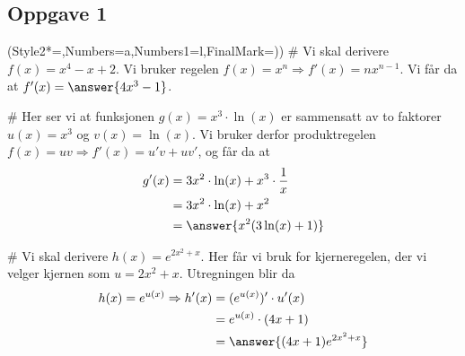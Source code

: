 \subsection*{Oppgave 1}
\begin{easylist}[enumerate]
	\ListProperties(Style2*=,Numbers=a,Numbers1=l,FinalMark={)})
	# Vi skal derivere $f(x) = x^4 - x +2$. Vi bruker regelen $f(x) = x^n \Rightarrow f'(x) = nx^{n-1}$. Vi får da at $f'(x) = \answer{4x^3 - 1}$.
	
	# Her ser vi at funksjonen $g(x) = x^3 \cdot \ln (x)$ er sammensatt av to faktorer $u(x) = x^3$ og $v(x) = \ln(x)$. 
	Vi bruker derfor produktregelen $f(x) = uv \Rightarrow f'(x) = u'v + uv'$, og får da at
	\begin{align*}
	g'(x) &= 3x^2 \cdot \ln(x) + x^3 \cdot \frac{1}{x}\\
			&= 3x^2 \cdot \ln(x) + x^2\\
			&= \answer{x^2(3\ln(x)+1)}
	\end{align*}
	
	# Vi skal derivere $h(x) = e^{2x^2 + x}$.
	Her får vi bruk for kjerneregelen, der vi velger kjernen som $u = 2x^2 + x$. 
	Utregningen blir da
	\begin{align*}
	h(x) = e^{u(x)} \Rightarrow h'(x) 
	&= (e^{u(x)})' \cdot u'(x) \\
	&= e^{u(x)} \cdot (4x + 1) \\
	&= \answer{(4x +1)e^{2x^2 + x}}
	\end{align*}
\end{easylist}


